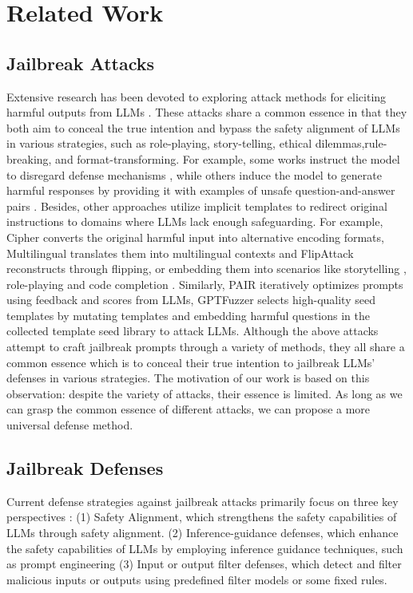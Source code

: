 
\section{Related Work}

\subsection{Jailbreak Attacks}
Extensive research has been devoted to exploring attack methods for eliciting harmful outputs from LLMs \citep{huang2025trustgen}.
These attacks share a common essence in that they both aim to conceal the true intention and bypass the safety alignment of LLMs in various strategies, such as role-playing, story-telling, ethical dilemmas,rule-breaking, and format-transforming. For example, some works instruct the model to disregard defense mechanisms \citep{perez2022ignore,schulhoff2023ignore}, while others induce the model to generate harmful responses by providing it with examples of unsafe question-and-answer pairs \citep{wei2023jailbreak}. Besides, other approaches utilize implicit templates to redirect original instructions to domains where LLMs lack enough safeguarding. For example, Cipher \citep{yuan2023gpt} converts the original harmful input into alternative encoding formats, Multilingual \citep{deng2023multilingual} translates them into multilingual contexts and FlipAttack \citep{liu2024flipattack} reconstructs through flipping, or embedding them into scenarios like storytelling \citep{ding2023wolf,li2023deepinception}, role-playing \citep{li2023multi} and code completion \citep{lv2024codechameleon}. Similarly, PAIR \citep{chao2023jailbreaking} iteratively optimizes prompts using feedback and scores from LLMs, GPTFuzzer \citep{yu2023gptfuzzer} selects high-quality seed templates by mutating templates and embedding harmful questions in the collected template seed library to attack LLMs.
Although the above attacks attempt to craft jailbreak prompts through a variety of methods, they all share a common essence which is to conceal their true intention to jailbreak LLMs' defenses in various strategies. The motivation of our work is based on this observation: despite the variety of attacks, their essence is limited. As long as we can grasp the common essence of different attacks, we can propose a more universal defense method.

\subsection{Jailbreak Defenses}
Current defense strategies against jailbreak attacks primarily focus on three key perspectives \citep{dong2024attacks}: (1) Safety Alignment, which strengthens the safety capabilities of LLMs through safety alignment. (2) Inference-guidance defenses, which enhance the safety capabilities of LLMs by employing inference guidance techniques, such as prompt engineering (3) Input or output filter defenses, which detect and filter malicious inputs or outputs using predefined filter models or some fixed rules.

